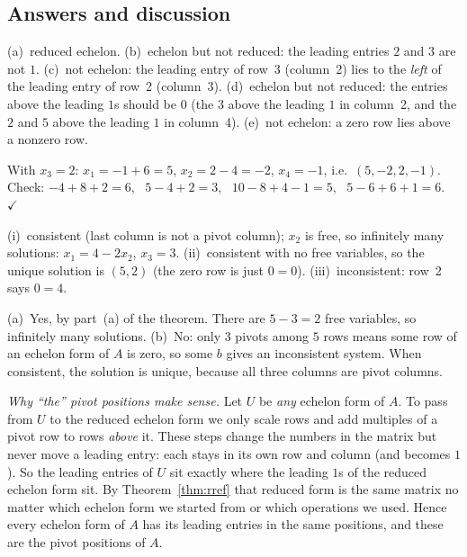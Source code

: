 \documentclass[11pt]{article}
\begin{document}
\subsection*{Answers and discussion}
\begin{description}[leftmargin=0pt,itemsep=5pt]
  \item[Knowledge Check \ref{kc:classify}.] (a)~reduced echelon. (b)~echelon but not reduced: the leading
        entries $2$ and $3$ are not $1$. (c)~not echelon: the leading entry of row~3 (column~2) lies to the
        \emph{left} of the leading entry of row~2 (column~3). (d)~echelon but not reduced: the entries above the
        leading $1$s should be $0$ (the $3$ above the leading $1$ in column~2, and the $2$ and $5$ above the
        leading $1$ in column~4). (e)~not echelon: a zero row lies above a nonzero row.
  \item[Knowledge Check \ref{kc:another}.] With $x_3=2$: $x_1=-1+6=5$, $x_2=2-4=-2$, $x_4=-1$, i.e.\
        $(5,-2,2,-1)$. Check: $-4+8+2=6$, \ $5-4+2=3$, \ $10-8+4-1=5$, \ $5-6+6+1=6$. \ $\checkmark$
  \item[Knowledge Check \ref{kc:readpivots}.] (i)~consistent (last column is not a pivot column); $x_2$ is free,
        so infinitely many solutions: $x_1=4-2x_2$, $x_3=3$. (ii)~consistent with no free variables, so the unique
        solution is $(5,2)$ (the zero row is just $0=0$). (iii)~inconsistent: row~2 says $0=4$.
  \item[Knowledge Check \ref{kc:counting}.] (a)~Yes, by part~(a) of the theorem. There are $5-3=2$ free variables,
        so infinitely many solutions. (b)~No: only $3$ pivots among $5$ rows means some row of an echelon form of $A$
        is zero, so some $b$ gives an inconsistent system. When consistent, the solution is unique, because all
        three columns are pivot columns.
  \item[Pause and think \ref{think:pivotpos}.] \emph{Why ``the'' pivot positions make sense.} Let $U$ be
        \emph{any} echelon form of $A$. To pass from $U$ to the reduced echelon form we only scale rows and add
        multiples of a pivot row to rows \emph{above} it. These steps change the numbers in the matrix but never
        move a leading entry: each stays in its own row and column (and becomes $1$). So the leading entries of
        $U$ sit exactly where the leading $1$s of the reduced echelon form sit. By Theorem~\ref{thm:rref} that
        reduced form is the same matrix no matter which echelon form we started from or which operations we used.
        Hence every echelon form of $A$ has its leading entries in the same positions, and these are the
        pivot positions of $A$.
 

\end{description}
\end{document}
